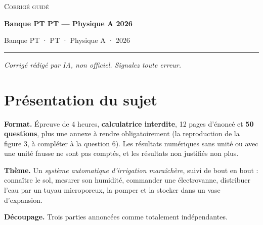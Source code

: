 \documentclass[11pt,a4paper]{article}
\begin{document}
\thispagestyle{plain}
\begin{center}
  {\small\scshape Corrigé guidé}\par\smallskip
  {\LARGE\bfseries Banque PT PT — Physique A 2026\par}\medskip
  {\large Banque PT · PT · Physique A · 2026\par}
\end{center}
\vspace{2pt}\hrule\vspace{8pt}

\emph{Corrigé rédigé par IA, non officiel. Signalez toute erreur.}

\hypertarget{pruxe9sentation-du-sujet}{%
\section{Présentation du sujet}\label{pruxe9sentation-du-sujet}}

\textbf{Format.} Épreuve de 4 heures, \textbf{calculatrice interdite}, 12 pages d'énoncé et \textbf{50 questions}, plus une annexe à rendre obligatoirement (la reproduction de la figure 3, à compléter à la question 6). Les résultats numériques sans unité ou avec une unité fausse ne sont pas comptés, et les résultats non justifiés non plus.

\textbf{Thème.} Un \emph{système automatique d'irrigation maraîchère}, suivi de bout en bout : connaître le sol, mesurer son humidité, commander une électrovanne, distribuer l'eau par un tuyau microporeux, la pomper et la stocker dans un vase d'expansion.

\textbf{Découpage.} Trois parties annoncées comme totalement indépendantes.
\end{document}
